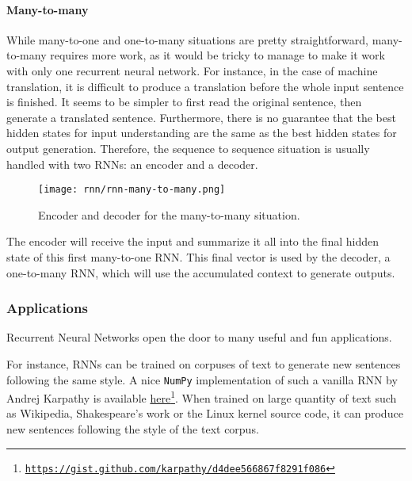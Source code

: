\paragraph*{Many-to-many}
While many-to-one and one-to-many situations are pretty straightforward, many-to-many requires more work, as it would be tricky to manage to make it work with only one recurrent neural network. For instance, in the case of machine translation, it is difficult to produce a translation before the whole input sentence is finished. It seems to be simpler to first read the original sentence, then generate a translated sentence. Furthermore, there is no guarantee that the best hidden states for input understanding are the same as the best hidden states for output generation. Therefore, the sequence to sequence situation is usually handled with two RNNs: an encoder and a decoder.
\begin{figure}[H]
    \centering
    \texttt{[image: rnn/rnn-many-to-many.png]}
    \caption{Encoder and decoder for the many-to-many situation.}
\end{figure}
The encoder will receive the input and summarize it all into the final hidden state of this first many-to-one RNN. This final vector is used by the decoder, a one-to-many RNN, which will use the accumulated context to generate outputs.

\subsubsection{Applications}
Recurrent Neural Networks open the door to many useful and fun applications.

For instance, RNNs can be trained on corpuses of text to generate new sentences following the same style. A nice \texttt{NumPy} implementation of such a vanilla RNN by Andrej Karpathy is available \href{https://gist.github.com/karpathy/d4dee566867f8291f086}{here}\footnote{\href{https://gist.github.com/karpathy/d4dee566867f8291f086}{\nolinkurl{https://gist.github.com/karpathy/d4dee566867f8291f086}}}. When trained on large quantity of text such as Wikipedia, Shakespeare's work or the Linux kernel source code, it can produce new sentences following the style of the text corpus.

